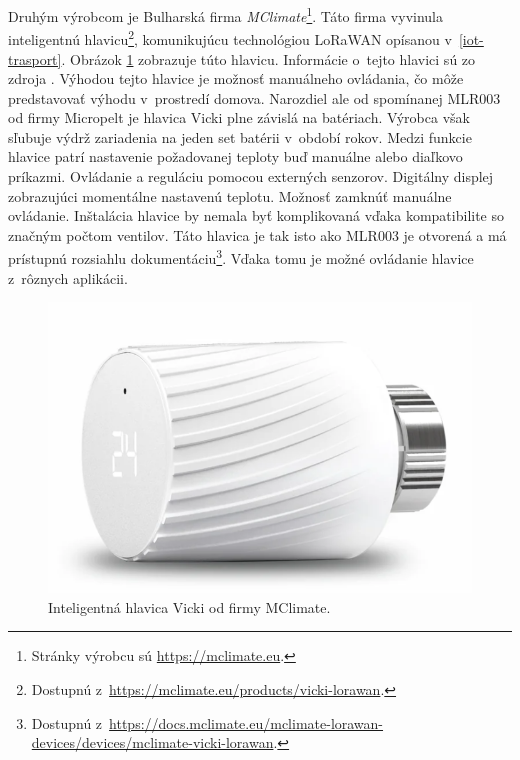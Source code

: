 Druhým výrobcom je Bulharská firma \emph{MClimate}\footnote{Stránky výrobcu sú \url{https://mclimate.eu}.}. 
Táto firma vyvinula inteligentnú hlavicu\footnote{Dostupnú z~\url{https://mclimate.eu/products/vicki-lorawan}.}, komunikujúcu technológiou LoRaWAN opísanou v~\ref{iot-trasport}. Obrázok \ref{fig:LORA-MCLIMATE} zobrazuje túto hlavicu.
Informácie o~tejto hlavici sú zo zdroja \cite{vicki}.
Výhodou tejto hlavice je možnosť manuálneho ovládania, čo môže predstavovať výhodu v~prostredí domova. 
Narozdiel ale od spomínanej MLR003 od firmy Micropelt je hlavica Vicki plne závislá na batériach. 
Výrobca však sľubuje výdrž zariadenia na jeden set batérii v~období rokov. 
Medzi funkcie hlavice patrí nastavenie požadovanej teploty buď manuálne alebo diaľkovo príkazmi.
Ovládanie a reguláciu pomocou externých senzorov.
Digitálny displej zobrazujúci momentálne nastavenú teplotu. 
Možnosť zamknúť manuálne ovládanie. 
Inštalácia hlavice by nemala byť komplikovaná vďaka kompatibilite so značným počtom ventilov.
Táto hlavica je tak isto ako MLR003 je otvorená a má prístupnú rozsiahlu dokumentáciu\footnote{Dostupnú z~\url{https://docs.mclimate.eu/mclimate-lorawan-devices/devices/mclimate-vicki-lorawan}.}. 
Vďaka tomu je možné ovládanie hlavice z~rôznych aplikácii.
\begin{figure}[H]
    \centering
    \includegraphics[scale=0.285]{obrazky-figures/vicky.png}
    \caption{Inteligentná hlavica Vicki od firmy MClimate.}
    \label{fig:LORA-MCLIMATE}
\end{figure}

